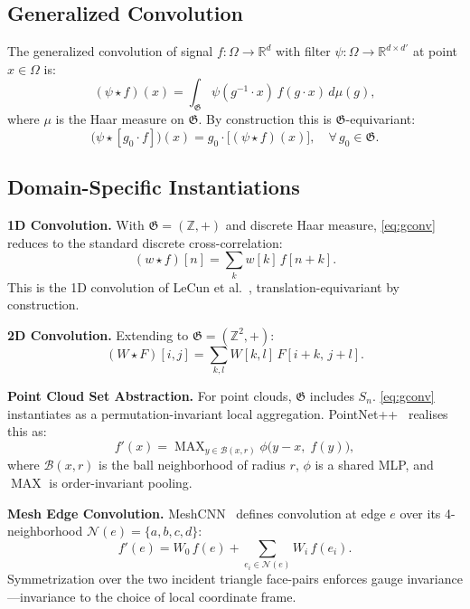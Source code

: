 \documentclass[10pt,conference]{IEEEtran}
\newcommand{\R}{\mathbb{R}}
\newcommand{\Z}{\mathbb{Z}}
\newcommand{\fG}{\mathfrak{G}}
\DeclareMathOperator{\MAX}{MAX}
\begin{document}
\subsection{Generalized Convolution}

The generalized convolution of signal $f\colon\Omega\to\R^d$ with filter
$\psi\colon\Omega\to\R^{d\times d'}$ at point $x\in\Omega$ is:
\begin{equation}
  (\psi \star f)(x)
    = \int_{\fG} \psi(g^{-1}\!\cdot x)\,f(g\cdot x)\,d\mu(g),
  \label{eq:gconv}
\end{equation}
where $\mu$ is the Haar measure on $\fG$. By construction this is
$\fG$-equivariant:
\begin{equation}
  \bigl(\psi \star [g_0\cdot f]\bigr)(x)
    = g_0 \cdot \bigl[(\psi \star f)(x)\bigr],
  \quad \forall\, g_0 \in \fG.
  \label{eq:equivariance}
\end{equation}

\subsection{Domain-Specific Instantiations}

\noindent\textbf{1D Convolution.}
With $\fG{=}(\Z,{+})$ and discrete Haar measure,
\eqref{eq:gconv} reduces to the standard discrete cross-correlation:
\begin{equation}
  (w\star f)[n] = \sum_{k} w[k]\,f[n+k].
  \label{eq:conv1d}
\end{equation}
This is the 1D convolution of LeCun et al.~\cite{lecun1998gradient},
translation-equivariant by construction.

\noindent\textbf{2D Convolution.}
Extending to $\fG{=}(\Z^2,{+})$:
\begin{equation}
  (W\star F)[i,j] = \sum_{k,l} W[k,l]\,F[i+k,\,j+l].
  \label{eq:conv2d}
\end{equation}

\noindent\textbf{Point Cloud Set Abstraction.}
For point clouds, $\fG$ includes $S_n$. \eqref{eq:gconv} instantiates as a
permutation-invariant local aggregation. PointNet++~\cite{qi2017pointnetplusplus}
realises this as:
\begin{equation}
  f'(x) = \MAX_{y\in\mathcal{B}(x,r)} \phi\bigl(y-x,\;f(y)\bigr),
  \label{eq:setabst}
\end{equation}
where $\mathcal{B}(x,r)$ is the ball neighborhood of radius $r$, $\phi$
is a shared MLP, and $\MAX$ is order-invariant pooling.

\noindent\textbf{Mesh Edge Convolution.}
MeshCNN~\cite{hanocka2019meshcnn} defines convolution at edge $e$ over its
4-neighborhood $\mathcal{N}(e){=}\{a,b,c,d\}$:
\begin{equation}
  f'(e) = W_0\,f(e) + \sum_{e_i\in\mathcal{N}(e)} W_i\,f(e_i).
  \label{eq:meshconv}
\end{equation}
Symmetrization over the two incident triangle face-pairs enforces gauge
invariance---invariance to the choice of local coordinate frame.
\end{document}
